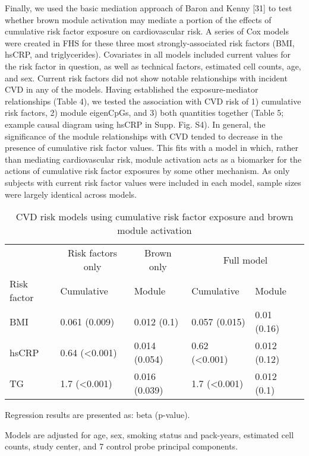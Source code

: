 \documentclass[]{bmcart}
\begin{document}
Finally, we used the basic mediation approach of Baron and Kenny
{[}31{]} to test whether brown module activation may mediate a portion
of the effects of cumulative risk factor exposure on cardiovascular
risk. A series of Cox models were created in FHS for these three most
strongly-associated risk factors (BMI, hsCRP, and triglycerides).
Covariates in all models included current values for the risk factor in
question, as well as technical factors, estimated cell counts, age, and
sex. Current risk factors did not show notable relationships with
incident CVD in any of the models. Having established the
exposure-mediator relationships (Table 4), we tested the association
with CVD risk of 1) cumulative risk factors, 2) module eigenCpGs, and 3)
both quantities together (Table 5; example causal diagram using hsCRP in
Supp. Fig. S4). In general, the significance of the module relationships
with CVD tended to decrease in the presence of cumulative risk factor
values. This fits with a model in which, rather than mediating
cardiovascular risk, module activation acts as a biomarker for the
actions of cumulative risk factor exposures by some other mechanism. As
only subjects with current risk factor values were included in each
model, sample sizes were largely identical across models.

\begin{table}[t]

\caption{\label{tab:module-mediation}CVD risk models using cumulative risk factor exposure and brown module activation}
\centering
\begin{threeparttable}
\begin{tabular}{lllll}
\toprule
\multicolumn{1}{c}{} & \multicolumn{1}{c}{Risk factors only} & \multicolumn{1}{c}{Brown only} & \multicolumn{2}{c}{Full model} \\
\cmidrule(l{3pt}r{3pt}){2-2} \cmidrule(l{3pt}r{3pt}){3-3} \cmidrule(l{3pt}r{3pt}){4-5}
Risk factor & Cumulative & Module & Cumulative & Module\\
\midrule
BMI & 0.061 (0.009) & 0.012 (0.1) & 0.057 (0.015) & 0.01 (0.16)\\
hsCRP & 0.64 (<0.001) & 0.014 (0.054) & 0.62 (<0.001) & 0.012 (0.12)\\
TG & 1.7 (<0.001) & 0.016 (0.039) & 1.7 (<0.001) & 0.012 (0.1)\\
\bottomrule
\end{tabular}
\begin{tablenotes}
\item * Regression results are presented as: beta (p-value).
\item * Models are adjusted for age, sex, smoking status and pack-years, estimated cell counts, study center, and 7 control probe principal components.
\end{tablenotes}
\end{threeparttable}
\end{table}
\end{document}
